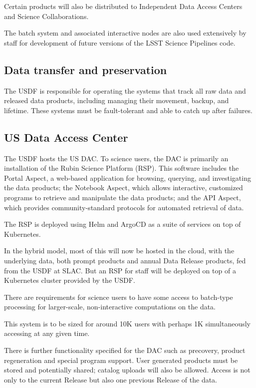 Certain products will also be distributed to Independent Data Access Centers and Science Collaborations.

The batch system and associated interactive nodes are also used extensively by staff for development of future versions of the LSST Science Pipelines code.

\subsection{Data transfer and preservation} \label{req:dbb}
The USDF is responsible for operating the systems that track all raw data and released data products, including managing their movement, backup, and lifetime.
These systems must be fault-tolerant and able to catch up after failures.

\subsection{US Data Access Center}
The USDF hosts the US DAC.
To science users, the DAC is primarily an installation of the Rubin Science Platform (RSP).
This software includes the Portal Aspect, a web-based application for browsing, querying, and investigating the data products; the Notebook Aspect, which allows interactive, customized programs to retrieve and manipulate the data products; and the API Aspect, which provides community-standard protocols for automated retrieval of data.

The RSP is deployed using Helm and ArgoCD as a suite of services on top of Kubernetes.

In the hybrid model, most of this will now be hosted in the cloud, with the underlying data, both prompt products and annual Data Release products, fed from the USDF at SLAC.
But an RSP for staff will be deployed on top of a Kubernetes cluster provided by the USDF.

There are requirements for science users to have some access to batch-type processing for larger-scale, non-interactive computations on the data.

This system is to be sized for around 10K users with perhaps 1K simultaneously accessing at any given time.

There is further functionality specified for the DAC such as precovery, product regeneration and special program support.
User generated products must be stored and potentially shared; catalog uploads will also be allowed.
Access is not only to the current Release but also one previous Release of the data.

